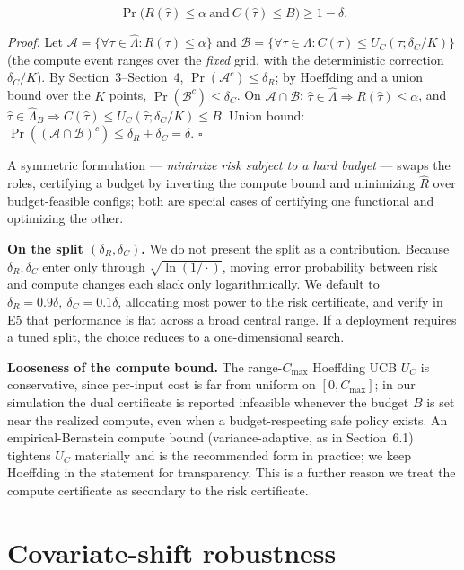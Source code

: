 \documentclass{ieeeaccess}
\begin{document}
\[
\Pr\big(R(\hat\tau)\le\alpha \ \text{and}\ C(\hat\tau)\le B\big)\ge1-\delta.
\]

\emph{Proof.} Let $\mathcal A=\{\forall\tau\in\hat\Lambda:R(\tau)\le\alpha\}$ and $\mathcal B=\{\forall\tau\in\Lambda:C(\tau)\le U_C(\tau;\delta_C/K)\}$ (the compute event ranges over the \emph{fixed} grid, with the deterministic correction $\delta_C/K$). By Section~3--Section~4, $\Pr(\mathcal A^c)\le\delta_R$; by Hoeffding and a union bound over the $K$ points, $\Pr(\mathcal B^c)\le\delta_C$. On $\mathcal A\cap\mathcal B$: $\hat\tau\in\hat\Lambda\Rightarrow R(\hat\tau)\le\alpha$, and $\hat\tau\in\hat\Lambda_B\Rightarrow C(\hat\tau)\le U_C(\hat\tau;\delta_C/K)\le B$. Union bound: $\Pr((\mathcal A\cap\mathcal B)^c)\le\delta_R+\delta_C=\delta$. $\square$

A symmetric formulation --- \emph{minimize risk subject to a hard budget} --- swaps the roles, certifying a budget by inverting the compute bound and minimizing $\hat R$ over budget-feasible configs; both are special cases of certifying one functional and optimizing the other.

\textbf{On the split $(\delta_R,\delta_C)$.} We do not present the split as a contribution. Because $\delta_R,\delta_C$ enter only through $\sqrt{\ln(1/\cdot)}$, moving error probability between risk and compute changes each slack only logarithmically. We default to $\delta_R=0.9\delta,\ \delta_C=0.1\delta$, allocating most power to the risk certificate, and verify in E5 that performance is flat across a broad central range. If a deployment requires a tuned split, the choice reduces to a one-dimensional search.

\textbf{Looseness of the compute bound.} The range-$C_{\max}$ Hoeffding UCB $U_C$ is conservative, since per-input cost is far from uniform on $[0,C_{\max}]$; in our simulation the dual certificate is reported infeasible whenever the budget $B$ is set near the realized compute, even when a budget-respecting safe policy exists. An empirical-Bernstein compute bound (variance-adaptive, as in Section~6.1) tightens $U_C$ materially and is the recommended form in practice; we keep Hoeffding in the statement for transparency. This is a further reason we treat the compute certificate as secondary to the risk certificate.

\section{Covariate-shift robustness}
\end{document}
